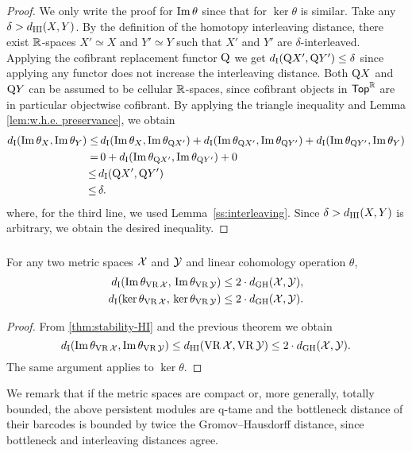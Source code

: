\begin{proof}
	We only write the proof for $\operatorname{Im}\theta$ since that for $\ker\theta$ is similar.
	Take any $\delta > d_{\mathrm{HI}}(X,Y)$.
	By the definition of the homotopy interleaving distance, there exist $\mathbb{R}$-spaces $X' \simeq X$ and $Y' \simeq Y$ such that $X'$ and $Y'$ are $\delta$-interleaved.
	Applying the cofibrant replacement functor $\mathrm{Q}$ we get $d_{\mathrm{I}}(\mathrm{Q} X', \mathrm{Q} Y') \leq \delta$ since applying any functor does not increase the interleaving distance.
	Both $\mathrm{Q} X$ and $\mathrm{Q} Y$ can be assumed to be cellular $\mathbb{R}$-spaces, since cofibrant objects in $\mathsf{Top}^{\mathbb{R}}$ are in particular objectwise cofibrant.
	By applying the triangle inequality and Lemma \ref{lem:w.h.e. preservance}, we obtain
	\begin{align*}
		d_{\mathrm{I}}(\operatorname{Im}\theta_{X}, \operatorname{Im}\theta_{Y}) \leq& \,
		d_{\mathrm{I}}(\operatorname{Im}\theta_{X}, \operatorname{Im}\theta_{\mathrm{Q} X'}) + d_{\mathrm{I}}(\operatorname{Im}\theta_{\mathrm{Q} X'}, \operatorname{Im}\theta_{\mathrm{Q} Y'}) + d_{\mathrm{I}}(\operatorname{Im}\theta_{\mathrm{Q} Y'}, \operatorname{Im}\theta_{Y}) \\ =& \, 
		0 + d_{\mathrm{I}}(\operatorname{Im}\theta_{\mathrm{Q} X'}, \operatorname{Im}\theta_{\mathrm{Q} Y'}) + 0 \\ \leq \,&
		d_{\mathrm{I}}(\mathrm{Q} X', \mathrm{Q} Y') \\ \leq \,&
		\delta.
	\end{align*}
	where, for the third line, we used Lemma~\ref{ss:interleaving}.
 	Since $\delta > d_{\mathrm{HI}}(X,Y)$ is arbitrary, we obtain the desired inequality.
\end{proof}

\subsubsection{}\label{cor:theta stability VR}

\corollary For any two metric spaces $\mathcal{X}$ and $\mathcal{Y}$ and linear cohomology operation $\theta$,
\begin{align*}
	d_{\mathrm{I}}(\operatorname{Im}\theta_{\operatorname{VR}\mathcal{X}},\, \operatorname{Im}\theta_{\operatorname{VR}\mathcal{Y}}) \leq 2 \cdot d_{\mathrm{GH}}(\mathcal{X},\mathcal{Y}), \\
	d_{\mathrm{I}}(\ker\theta_{\operatorname{VR}\mathcal{X}},\, \ker\theta_{\operatorname{VR}\mathcal{Y}}) \leq 2 \cdot d_{\mathrm{GH}}(\mathcal{X},\mathcal{Y}).
\end{align*}

\begin{proof}
        From \cref{thm:stability-HI} and the previous theorem we obtain
        \[
        d_{\mathrm{I}}(\operatorname{Im}\theta_{\operatorname{VR}\mathcal{X}}, \operatorname{Im}\theta_{\operatorname{VR}\mathcal{Y}}) \leq
        d_{\mathrm{HI}}(\operatorname{VR}\mathcal{X}, \operatorname{VR}\mathcal{Y}) \leq 2 \cdot d_{\mathrm{GH}}(\mathcal{X},\mathcal{Y}).
        \]
        The same argument applies to $\ker\theta$.
\end{proof}

We remark that if the metric spaces are compact or, more generally, totally bounded, the above persistent modules are q-tame and the bottleneck distance of their barcodes is bounded by twice the Gromov--Hausdorff distance, since bottleneck and interleaving distances agree.
